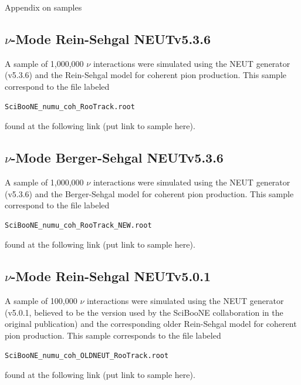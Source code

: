 \documentclass[11pt]{article}
\begin{document}
Appendix on samples

\subsection{$\nu$-Mode Rein-Sehgal NEUTv5.3.6}
A sample of 1,000,000 $\nu$ interactions were simulated using the NEUT generator (v5.3.6) and the Rein-Sehgal model for coherent pion production. This sample correspond to the file labeled 
\begin{verbatim}
SciBooNE_numu_coh_RooTrack.root
\end{verbatim}
found at the following link (put link to sample here).

\subsection{$\nu$-Mode Berger-Sehgal NEUTv5.3.6}
A sample of 1,000,000 $\nu$ interactions were simulated using the NEUT generator (v5.3.6) and the Berger-Sehgal model for coherent pion production. This sample correspond to the file labeled
\begin{verbatim}
SciBooNE_numu_coh_RooTrack_NEW.root
\end{verbatim}
found at the following link (put link to sample here).



\subsection{$\nu$-Mode Rein-Sehgal NEUTv5.0.1}
A sample of 100,000 $\nu$ interactions were simulated using the NEUT generator (v5.0.1, believed to be the version used by the SciBooNE collaboration in the original publication) and the corresponding older Rein-Sehgal model for coherent pion production. This sample corresponds to the file labeled
\begin{verbatim}
SciBooNE_numu_coh_OLDNEUT_RooTrack.root
\end{verbatim}
found at the following link (put link to sample here).


\end{document}
